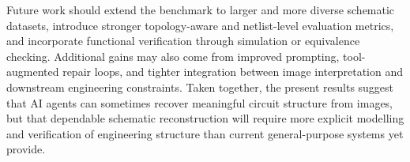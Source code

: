 Future work should extend the benchmark to larger and more diverse schematic datasets, introduce stronger topology-aware and netlist-level evaluation metrics, and incorporate functional verification through simulation or equivalence checking. Additional gains may also come from improved prompting, tool-augmented repair loops, and tighter integration between image interpretation and downstream engineering constraints. Taken together, the present results suggest that AI agents can sometimes recover meaningful circuit structure from images, but that dependable schematic reconstruction will require more explicit modelling and verification of engineering structure than current general-purpose systems yet provide.

